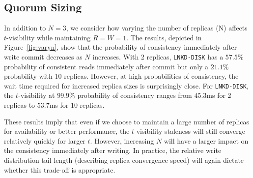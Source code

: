 \documentclass{vldb}
\newcommand{\subsectionskip}{-0em}
\begin{document}
\vspace{\subsectionskip}\subsection{Quorum Sizing}

In addition to $N$$=$$3$, we consider how varying the number of
replicas (N) affects $t$-visibility while maintaining
$R$$=$$W$$=$$1$. The results, depicted in Figure~\ref{fig:varyn}, show
that the probability of consistency immediately after write commit
decreases as $N$ increases.  With 2 replicas, \texttt{LNKD-DISK} has a
$57.5\%$ probability of consistent reads immediately after commit but
only a $21.1\%$ probability with 10 replicas.  However, at high
probabilities of consistency, the wait time required for increased
replica sizes is surprisingly close.  For \texttt{LNKD-DISK}, the
$t$-visibility at $99.9\%$ probability of consistency ranges from
$45.3$ms for 2 replicas to $53.7$ms for 10 replicas.

These results imply that even if we choose to maintain a large number
of replicas for availability or better performance, the $t$-visibility
staleness will still converge relatively quickly for larger $t$.
However, increasing $N$ will have a larger impact on the consistency
immediately after writing.  In practice, the relative write
distribution tail length (describing replica convergence speed) will
again dictate whether this trade-off is appropriate.
\end{document}

